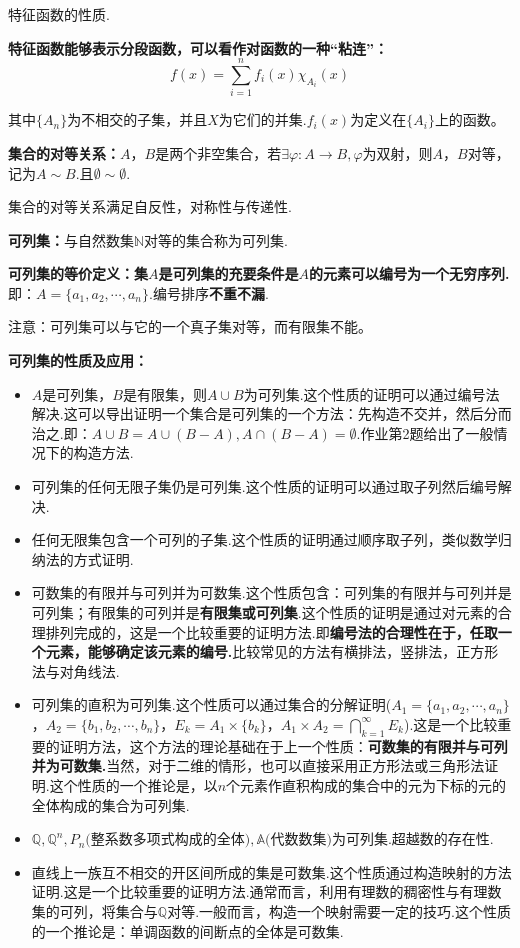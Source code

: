 \documentclass[bwprint, withoutpreface]{cumcmthesis}
\begin{document}
特征函数的性质.

\textbf{特征函数能够表示分段函数，可以看作对函数的一种“粘连”：}
\begin{equation*}
	f(x) = \sum_{i = 1}^{n}{f_i(x)\chi_{A_i}(x)}
\end{equation*}

其中$\{A_n\}$为不相交的子集，并且$X$为它们的并集.$f_i(x)$为定义在$\{A_i\}$上的函数。

\textbf{集合的对等关系：}$A$，$B$是两个非空集合，若$\exists \varphi:A \to B, \varphi\mbox{为双射}$，则$A$，$B$对等，记为$A \sim B$.且$\emptyset \sim \emptyset$.

集合的对等关系满足自反性，对称性与传递性.

\textbf{可列集：}与自然数集$\mathbb{N}$对等的集合称为可列集.

\textbf{可列集的等价定义：集$A$是可列集的充要条件是$A$的元素可以编号为一个无穷序列.}即：$A=\{a_1, a_2, \cdots, a_n\}$.编号排序\textbf{不重不漏}.

注意：可列集可以与它的一个真子集对等，而有限集不能。

\textbf{可列集的性质及应用：}

\begin{itemize}[itemindent=2em]
	\item $A$是可列集，$B$是有限集，则$A \cup B$为可列集.这个性质的证明可以通过编号法解决.这可以导出证明一个集合是可列集的一个方法：先构造不交并，然后分而治之.即：$A \cup B = A \cup (B - A), A \cap (B - A) = \emptyset$.作业第2题给出了一般情况下的构造方法.
	\item 可列集的任何无限子集仍是可列集.这个性质的证明可以通过取子列然后编号解决.
	\item 任何无限集包含一个可列的子集.这个性质的证明通过顺序取子列，类似数学归纳法的方式证明.
	\item 可数集的有限并与可列并为可数集.这个性质包含：可列集的有限并与可列并是可列集；有限集的可列并是\textbf{有限集或可列集}.这个性质的证明是通过对元素的合理排列完成的，这是一个比较重要的证明方法.即\textbf{编号法的合理性在于，任取一个元素，能够确定该元素的编号.}比较常见的方法有横排法，竖排法，正方形法与对角线法.
	\item 可列集的直积为可列集.这个性质可以通过集合的分解证明($A_1=\{a_1, a_2, \cdots, a_n\}$，$A_2=\{b_1, b_2, \cdots, b_n\}$，$E_k=A_1 \times \{b_k\}$，$A_1 \times A_2 = \bigcap_{k=1}^{\infty}{E_k}$).这是一个比较重要的证明方法，这个方法的理论基础在于上一个性质：\textbf{可数集的有限并与可列并为可数集.}当然，对于二维的情形，也可以直接采用正方形法或三角形法证明.这个性质的一个推论是，以$n$个元素作直积构成的集合中的元为下标的元的全体构成的集合为可列集.
	\item $\mathbb{Q}, \mathbb{Q}^n, P_n\mbox{(整系数多项式构成的全体)},\mathbb{A}\mbox{(代数数集)}$为可列集.超越数的存在性.
	\item 直线上一族互不相交的开区间所成的集是可数集.这个性质通过构造映射的方法证明.这是一个比较重要的证明方法.通常而言，利用有理数的稠密性与有理数集的可列，将集合与$\mathbb{Q}$对等.一般而言，构造一个映射需要一定的技巧.这个性质的一个推论是：单调函数的间断点的全体是可数集.
\end{itemize}
\end{document}
